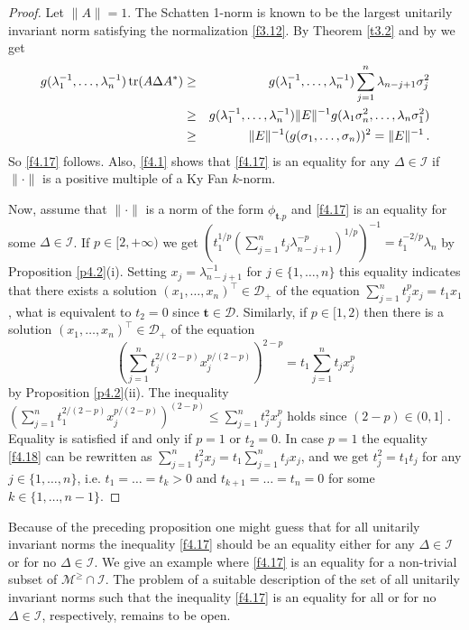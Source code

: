 \documentclass{amsart}
\begin{document}
\begin{proof}
Let $\| A \|=1$. The Schatten 1-norm is known to be the largest unitarily invariant norm satisfying the normalization \eqref{f3.12}. By Theorem \ref{t3.2} and by \cite[IV.1.6]{Bh} we get 
   \begin{eqnarray*}
        g(\lambda_1^{-1}, \ldots , \lambda_n^{-1}) \, {\rm tr}(A \Delta A^*)
             & \geq & g(\lambda_1^{-1}, \ldots , \lambda_n^{-1})\sum_{j=1}^n \lambda_{n-j+1} \sigma_j^2 \\
             & \geq &  g(\lambda_1^{-1}, \ldots , \lambda_n^{-1}) \| E \|^{-1}   g(\lambda_1 \sigma_n^2, \ldots , \lambda_n \sigma_1^2) \\
             & \geq & \| E \|^{-1}   (g(\sigma_1, \ldots , \sigma_n))^2 = \| E \|^{-1}\, . 
   \end{eqnarray*}
So \eqref{f4.17} follows. Also, \eqref{f4.1} shows that \eqref{f4.17} is an equality for any $\Delta \in \mathcal I$ if $\| \cdot \|$ is a positive multiple of a Ky Fan $k$-norm. 

Now, assume that $\| \cdot \|$ is a norm of the form $\phi_{{\mathbf t}.p}$ and \eqref{f4.17} is an equality for some $\Delta \in {\mathcal I}$. If $p \in [2,+\infty)$ we get $(t_1^{1/p}(\sum_{j=1}^n t_j \lambda_{n-j+1}^{-p})^{1/p})^{-1} = t_1^{-2/p} \lambda_n$ by Proposition \ref{p4.2}(i). Setting $x_j = \lambda_{n-j+1}^{-1}$ for $j \in \{ 1,\ldots, n \}$ this equality indicates that there exists a solution $(x_1,\ldots,x_n)^\top \in {\mathcal D}_+$ of the equation $\sum_{j=1}^n t_j^px_j = t_1 x_1$, what is equivalent to $t_2=0$ since ${\mathbf t} \in \mathcal D$. Similarly, if $p \in [1,2)$ then there is a solution $(x_1,\ldots,x_n)^\top \in {\mathcal D}_+$ of the equation
\begin{equation} \label{f4.18}
    \left( \sum_{j=1}^n t_j^{2 / (2-p)} x_j^{p/(2-p)} \right)^{2-p} = t_1 \sum_{j=1}^n t_j x_j^p 
\end{equation}
by Proposition \ref{p4.2}(ii). The inequality $(\sum_{j=1}^n t_1^{2/(2-p)} x_j^{p / (2-p)} )^{(2-p)} \leq \sum_{j=1}^n t_j^2 x_j^p$ holds since $(2-p) \in (0,1]$ . Equality is satisfied if and only if $p=1$ or $t_2=0$. In case $p=1$ the equality \eqref{f4.18} can be rewritten as $\sum_{j=1}^n t_j^2 x_j = t_1 \sum_{j=1}^n t_j x_j$, and we get $t_j^2 = t_1 t_j$ for any $j \in \{1,\ldots,n \}$, i.e. $t_1= \ldots = t_k > 0$ and $t_{k+1}= \ldots =  t_n=0$ for some $k \in \{ 1,\ldots, n-1 \}$.        
\end{proof}   

Because of the preceding proposition one might guess that for all unitarily invariant norms the inequality \eqref{f4.17} should be an equality either for any $\Delta \in {\mathcal I}$ or for no $\Delta \in {\mathcal I}$. We give an example where \eqref{f4.17} is an equality for a non-trivial subset of ${\mathcal M}^\geq \cap \mathcal I$. The problem of a suitable description of the set of all unitarily invariant norms such that the inequality \eqref{f4.17} is an equality for all or for no $\Delta \in \mathcal I$, respectively,  remains to be open. 
\end{document}

